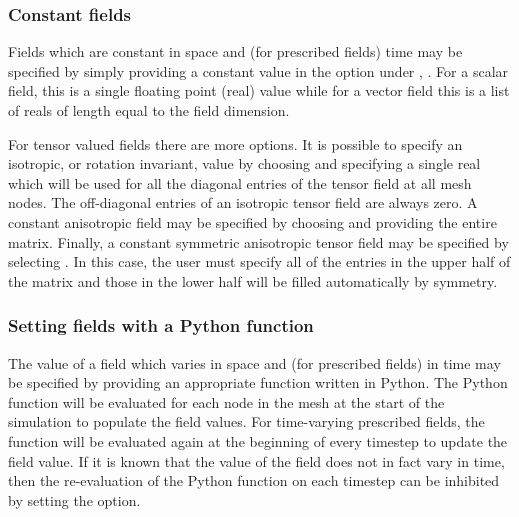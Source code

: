 \subsubsection{Constant fields}
Fields which are constant in space and (for prescribed fields) time may be
specified by simply providing a constant value in the 
option under ,
. For a scalar field, this is a single
floating point (real) value while for a vector field this is a list of reals
of length equal to the field dimension.

For tensor valued fields there are more options. It is possible to specify
an isotropic, or rotation invariant, value by choosing
 and specifying a single real which
will be used for all the diagonal entries of the tensor field at all mesh
nodes. The off-diagonal entries of an isotropic tensor field are always
zero. A constant anisotropic field may be specified by choosing
 and providing the
entire matrix. Finally, a constant symmetric anisotropic tensor field may be
specified by selecting \onlypdf\linebreak
{}. In this case, the
user must specify all of the entries in the upper half of the matrix and
those in the lower half will be filled automatically by symmetry.

\subsubsection{Setting fields with a Python function}\label{sec:setting_with_python}
The value of a field which varies in space and (for prescribed fields) in
time may be specified by providing an appropriate function written in
Python. The Python function will be evaluated for each node in the mesh at
the start of the simulation to populate the field values. For time-varying
prescribed fields, the function will be evaluated again at the beginning of
every timestep to update the field value. If it is known that the value of
the field does not in fact vary in time, then the re-evaluation of the
Python function on each timestep can be inhibited by setting the
\onlypdf\linebreak {} option.

